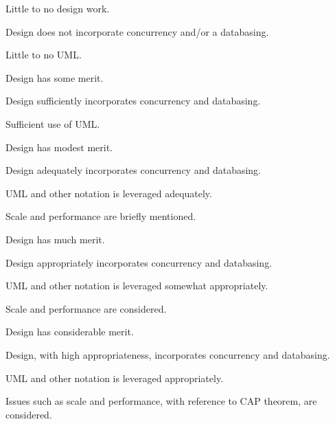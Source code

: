 \documentclass{../../fal_assignment}
\begin{document}
\rubricyeartwo
\begin{markingrubric}
%
%
        \grade\fail 	Little to no design work.
            \par 		Design does not incorporate concurrency and/or a databasing.
          \par 		Little to no UML.
          
        \grade 		Design has some merit.
            \par 		Design sufficiently incorporates concurrency and databasing. 
          \par 		Sufficient use of UML.
          
        \grade 		Design has modest merit.
            \par 		Design adequately incorporates concurrency and databasing.  
          \par 		UML and other notation is leveraged adequately.
            \par 		Scale and performance are briefly mentioned.
            
        \grade 		Design has much merit.
            \par 		Design appropriately incorporates concurrency and databasing.  
          \par 		UML and other notation is leveraged somewhat appropriately.
            \par 		Scale and performance are considered.
            
        \grade 		Design has considerable merit.
            \par 		Design, with high appropriateness, incorporates concurrency and databasing.  
          \par 		UML and other notation is leveraged appropriately.
            \par 		Issues such as scale and performance, with reference to CAP theorem, are considered.
            

\end{markingrubric}
\end{document}
